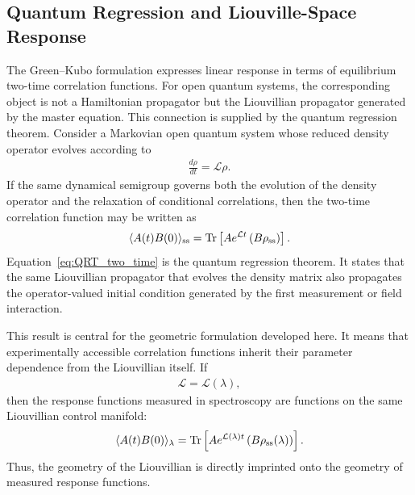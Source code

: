 \subsection{Quantum Regression and Liouville-Space Response}
\label{subsec:qrt_response}
The Green--Kubo formulation expresses linear response in terms
of equilibrium two-time correlation functions. For open quantum
systems, the corresponding object is not a Hamiltonian
propagator but the Liouvillian propagator generated by the
master equation. This connection is supplied by the quantum
regression theorem.
Consider a Markovian open quantum system whose reduced
density operator evolves according to
\begin{align}
\frac{d\rho}{dt}
=
\mathcal L\rho .
\end{align}
If the same dynamical semigroup governs both the evolution of
the density operator and the relaxation of conditional
correlations, then the two-time correlation function may be
written as
\begin{align}
\langle A(t)B(0)\rangle_{\rm ss}
=
{\rm Tr}
\left[
A e^{\mathcal L t}
\left(
B\rho_{\rm ss}
\right)
\right].
\label{eq:QRT_two_time}
\end{align}
Equation~\eqref{eq:QRT_two_time} is the quantum regression
theorem. It states that the same Liouvillian propagator that
evolves the density matrix also propagates the operator-valued
initial condition generated by the first measurement or field
interaction.

This result is central for the geometric formulation developed
here. It means that experimentally accessible correlation
functions inherit their parameter dependence from the
Liouvillian itself. If
\begin{align}
\mathcal L=\mathcal L(\lambda),
\end{align}
then the response functions measured in spectroscopy are
functions on the same Liouvillian control manifold:
\begin{align}
\langle A(t)B(0)\rangle_{\lambda}
=
{\rm Tr}
\left[
A e^{\mathcal L(\lambda)t}
\left(
B\rho_{\rm ss}(\lambda)
\right)
\right].
\end{align}
Thus, the geometry of the Liouvillian is directly imprinted onto
the geometry of measured response functions.

